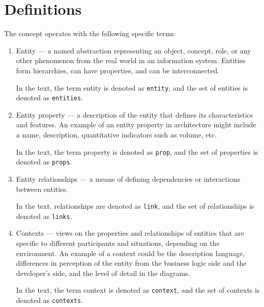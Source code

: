 \documentclass[final]{article}
\begin{document}
    \section{Definitions}

        The concept operates with the following specific terms:

        \begin{enumerate}

            \item Entity — a named abstraction representing an object,
            concept, role, or any other phenomenon from the real world in
            an information system. Entities form hierarchies, can have
            properties, and can be interconnected.

            In the text, the term entity is denoted as \texttt{entity}, and
            the set of entities is denoted as \texttt{entities}.

            \item Entity property — a description of the entity that defines its
            characteristics and features. An example of an entity property in
            architecture might include a name, description, quantitative indicators
            such as volume, etc.

            In the text, the term property is denoted as \texttt{prop}, and the set
            of properties is denoted as \texttt{props}.

            \item Entity relationships — a means of defining dependencies or
            interactions between entities.

            In the text, relationships are denoted as \texttt{link}, and the set
            of relationships is denoted as \texttt{links}.

            \item Contexts — views on the properties and relationships of entities
            that are specific to different participants and situations, depending on the environment.
            An example of a context could be the description language, differences in
            perception of the entity from the business logic side and the developer's side, and the level
            of detail in the diagrams.

            In the text, the term context is denoted as \texttt{context}, and the set
            of contexts is denoted as \texttt{contexts}.

        \end{enumerate}
\end{document}
